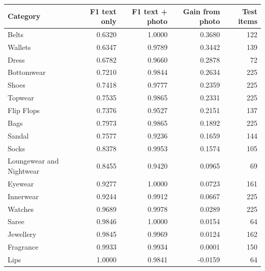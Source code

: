 \begin{tabular}{lrrrr}
\toprule
Category & F1 text only & F1 text + photo & Gain from photo & Test items \\
\midrule
Belts & 0.6320 & 1.0000 & 0.3680 & 122 \\
Wallets & 0.6347 & 0.9789 & 0.3442 & 139 \\
Dress & 0.6782 & 0.9660 & 0.2878 & 72 \\
Bottomwear & 0.7210 & 0.9844 & 0.2634 & 225 \\
Shoes & 0.7418 & 0.9777 & 0.2359 & 225 \\
Topwear & 0.7535 & 0.9865 & 0.2331 & 225 \\
Flip Flops & 0.7376 & 0.9527 & 0.2151 & 137 \\
Bags & 0.7973 & 0.9865 & 0.1892 & 225 \\
Sandal & 0.7577 & 0.9236 & 0.1659 & 144 \\
Socks & 0.8378 & 0.9953 & 0.1574 & 105 \\
Loungewear and Nightwear & 0.8455 & 0.9420 & 0.0965 & 69 \\
Eyewear & 0.9277 & 1.0000 & 0.0723 & 161 \\
Innerwear & 0.9244 & 0.9912 & 0.0667 & 225 \\
Watches & 0.9689 & 0.9978 & 0.0289 & 225 \\
Saree & 0.9846 & 1.0000 & 0.0154 & 64 \\
Jewellery & 0.9845 & 0.9969 & 0.0124 & 162 \\
Fragrance & 0.9933 & 0.9934 & 0.0001 & 150 \\
Lips & 1.0000 & 0.9841 & -0.0159 & 64 \\
\bottomrule
\end{tabular}
